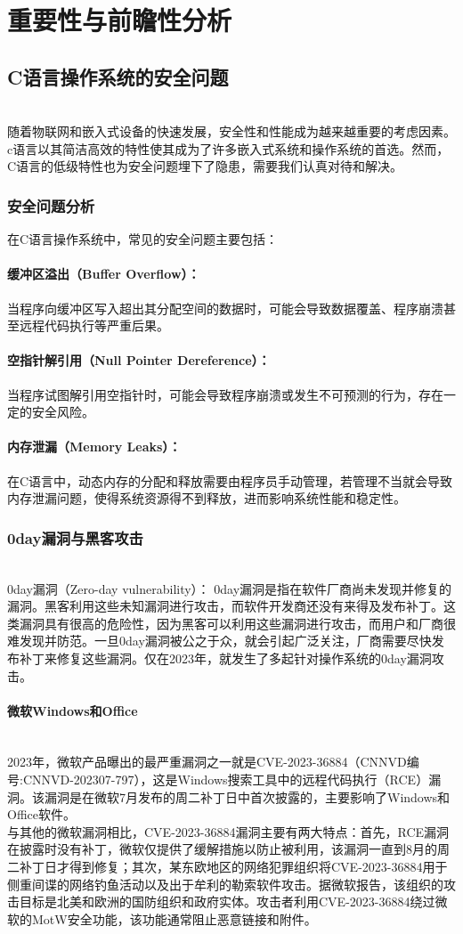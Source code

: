 \section{重要性与前瞻性分析}
\subsection{C语言操作系统的安全问题}\ \\
\indent 随着物联网和嵌入式设备的快速发展，安全性和性能成为越来越重要的考虑因素。c语言以其简洁高效的特性使其成为了许多嵌入式系统和操作系统的首选。然而，C语言的低级特性也为安全问题埋下了隐患，需要我们认真对待和解决。
\subsubsection{安全问题分析}
在C语言操作系统中，常见的安全问题主要包括：
\paragraph{缓冲区溢出（Buffer Overflow）：}
 当程序向缓冲区写入超出其分配空间的数据时，可能会导致数据覆盖、程序崩溃甚至远程代码执行等严重后果。
\paragraph{空指针解引用（Null Pointer Dereference）：}
 当程序试图解引用空指针时，可能会导致程序崩溃或发生不可预测的行为，存在一定的安全风险。
\paragraph{内存泄漏（Memory Leaks）：}
 在C语言中，动态内存的分配和释放需要由程序员手动管理，若管理不当就会导致内存泄漏问题，使得系统资源得不到释放，进而影响系统性能和稳定性。
\subsubsection{0day漏洞与黑客攻击}\ \\
 \indent 0day漏洞（Zero-day vulnerability）： 0day漏洞是指在软件厂商尚未发现并修复的漏洞。黑客利用这些未知漏洞进行攻击，而软件开发商还没有来得及发布补丁。这类漏洞具有很高的危险性，因为黑客可以利用这些漏洞进行攻击，而用户和厂商很难发现并防范。一旦0day漏洞被公之于众，就会引起广泛关注，厂商需要尽快发布补丁来修复这些漏洞。仅在2023年，就发生了多起针对操作系统的0day漏洞攻击。
\paragraph{微软Windows和Office}\ \\
 \indent 2023年，微软产品曝出的最严重漏洞之一就是CVE-2023-36884（CNNVD编号:CNNVD-202307-797），这是Windows搜索工具中的远程代码执行（RCE）漏洞。该漏洞是在微软7月发布的周二补丁日中首次披露的，主要影响了Windows和Office软件。\\
\indent 与其他的微软漏洞相比，CVE-2023-36884漏洞主要有两大特点：首先，RCE漏洞在披露时没有补丁，微软仅提供了缓解措施以防止被利用，该漏洞一直到8月的周二补丁日才得到修复；其次，某东欧地区的网络犯罪组织将CVE-2023-36884用于侧重间谍的网络钓鱼活动以及出于牟利的勒索软件攻击。据微软报告，该组织的攻击目标是北美和欧洲的国防组织和政府实体。攻击者利用CVE-2023-36884绕过微软的MotW安全功能，该功能通常阻止恶意链接和附件。
